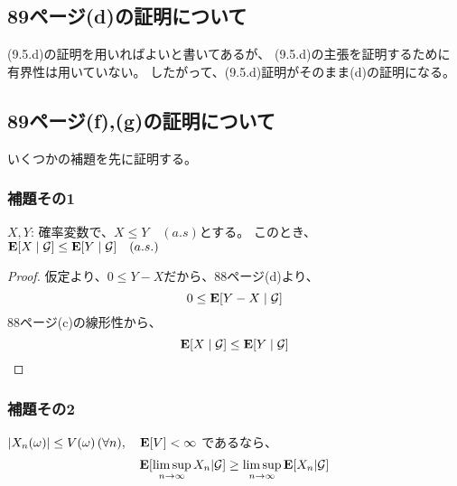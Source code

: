     \subsection{89ページ(d)の証明について}
      (9.5.d)の証明を用いればよいと書いてあるが、
      (9.5.d)の主張を証明するために有界性は用いていない。
      したがって、(9.5.d)証明がそのまま(d)の証明になる。

    \subsection{89ページ(f),(g)の証明について}
      いくつかの補題を先に証明する。
      \subsubsection{補題その1}
        \begin{lem}\label{lem1}
          $X,Y$: 確率変数で、$X \leq Y \quad (a.s)$とする。
          このとき、${\mathbf{E}}[X \mid \mathcal{G}] \leq {\mathbf{E}}[Y \mid \mathcal{G}] \quad (a.s.)$
        \end{lem}

        \begin{proof}
          仮定より、$0 \leq Y - X$だから、88ページ(d)より、
          \[
            0 \leq {\mathbf{E}}[ Y - X \mid \mathcal{G}]
          \]
          88ページ(c)の線形性から、
          \[
            {\mathbf{E}}[X \mid \mathcal{G}] \leq {\mathbf{E}}[Y \mid \mathcal{G}]
          \]
        \end{proof}

      \subsubsection{補題その2}
        \begin{lem}\label{lem2}
          $|X_n(\omega)| \leq V(\omega) \, (\forall n), \quad {\mathbf{E}}[V] < \infty$
          であるなら、
          \[
            {\mathbf{E}}[\limsup_{n \to \infty}X_n | \mathcal{G}] \ge \limsup_{n \to \infty}{\mathbf{E}}[X_n | \mathcal{G}]
          \]
        \end{lem}

